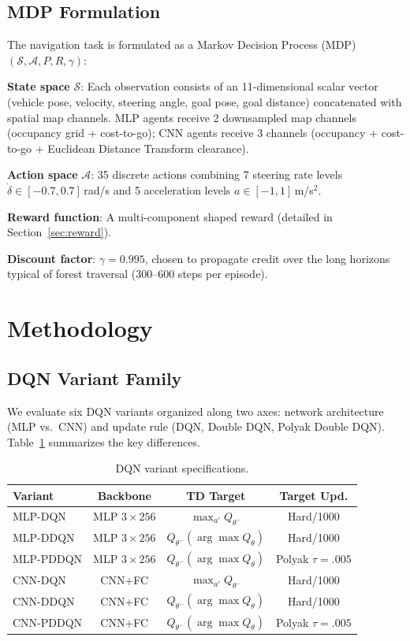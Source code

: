 \documentclass[conference]{IEEEtran}
\newcommand{\Qnet}{Q_\theta}
\newcommand{\Qtarget}{Q_{\theta^-}}
\begin{document}
\subsection{MDP Formulation}

The navigation task is formulated as a Markov Decision Process (MDP) $(\mathcal{S}, \mathcal{A}, P, R, \gamma)$:

\textbf{State space} $\mathcal{S}$: Each observation consists of an 11-dimensional scalar vector (vehicle pose, velocity, steering angle, goal pose, goal distance) concatenated with spatial map channels.
MLP agents receive 2 downsampled map channels (occupancy grid + cost-to-go); CNN agents receive 3 channels (occupancy + cost-to-go + Euclidean Distance Transform clearance).

\textbf{Action space} $\mathcal{A}$: 35 discrete actions combining 7 steering rate levels $\dot{\delta} \in [-0.7, 0.7]$\,rad/s and 5 acceleration levels $a \in [-1, 1]$\,m/s$^2$.

\textbf{Reward function}: A multi-component shaped reward (detailed in Section~\ref{sec:reward}).

\textbf{Discount factor}: $\gamma = 0.995$, chosen to propagate credit over the long horizons typical of forest traversal (300--600 steps per episode).

\section{Methodology}\label{sec:method}

\subsection{DQN Variant Family}\label{sec:variants}

We evaluate six DQN variants organized along two axes: network architecture (MLP vs.\ CNN) and update rule (DQN, Double DQN, Polyak Double DQN).
Table~\ref{tab:variants} summarizes the key differences.

\begin{table}[t]
\centering
\caption{DQN variant specifications.}
\label{tab:variants}
\footnotesize
\begin{tabular}{@{}lccc@{}}
\toprule
\textbf{Variant} & \textbf{Backbone} & \textbf{TD Target} & \textbf{Target Upd.} \\
\midrule
MLP-DQN   & MLP $3{\times}256$ & $\max_{a'} \Qtarget$ & Hard/1000 \\
MLP-DDQN  & MLP $3{\times}256$ & $\Qtarget(\arg\max \Qnet)$ & Hard/1000 \\
MLP-PDDQN & MLP $3{\times}256$ & $\Qtarget(\arg\max \Qnet)$ & Polyak $\tau{=}.005$ \\
CNN-DQN   & CNN+FC             & $\max_{a'} \Qtarget$ & Hard/1000 \\
CNN-DDQN  & CNN+FC             & $\Qtarget(\arg\max \Qnet)$ & Hard/1000 \\
CNN-PDDQN & CNN+FC             & $\Qtarget(\arg\max \Qnet)$ & Polyak $\tau{=}.005$ \\
\bottomrule
\end{tabular}
\end{table}
\end{document}
